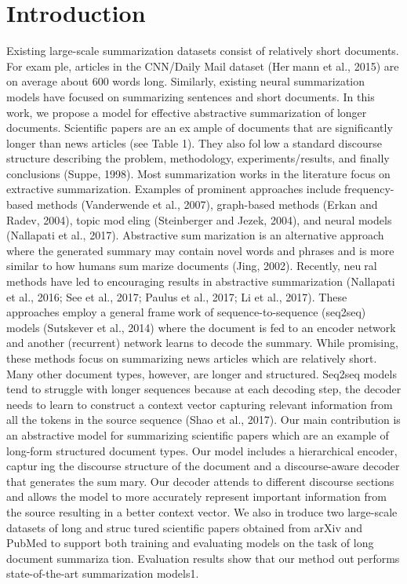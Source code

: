 \documentclass[aps,floatfix,prd,showpacs,twocolumn]{revtex4}
\begin{document}
\section{Introduction}
Existing large-scale summarization datasets
consist of relatively short documents. For example, articles in the CNN/Daily Mail dataset (Hermann et al., 2015) are on average about 600 words
long. Similarly, existing neural summarization
models have focused on summarizing sentences
and short documents. In this work, we propose a
model for effective abstractive summarization of
longer documents. Scientific papers are an example of documents that are significantly longer
than news articles (see Table 1). They also follow a standard discourse structure describing the
problem, methodology, experiments/results, and
finally conclusions (Suppe, 1998).
Most summarization works in the literature
focus on extractive summarization. Examples
of prominent approaches include frequency-based
methods (Vanderwende et al., 2007), graph-based
methods (Erkan and Radev, 2004), topic modeling (Steinberger and Jezek, 2004), and neural
models (Nallapati et al., 2017). Abstractive summarization is an alternative approach where the
generated summary may contain novel words and
phrases and is more similar to how humans summarize documents (Jing, 2002). Recently, neural methods have led to encouraging results in
abstractive summarization (Nallapati et al., 2016;
See et al., 2017; Paulus et al., 2017; Li et al.,
2017). These approaches employ a general framework of sequence-to-sequence (seq2seq) models
(Sutskever et al., 2014) where the document is
fed to an encoder network and another (recurrent)
network learns to decode the summary. While
promising, these methods focus on summarizing
news articles which are relatively short. Many
other document types, however, are longer and
structured. Seq2seq models tend to struggle with
longer sequences because at each decoding step,
the decoder needs to learn to construct a context
vector capturing relevant information from all the
tokens in the source sequence (Shao et al., 2017).
Our main contribution is an abstractive model
for summarizing scientific papers which are an
example of long-form structured document types.
Our model includes a hierarchical encoder, capturing the discourse structure of the document and a
discourse-aware decoder that generates the summary. Our decoder attends to different discourse
sections and allows the model to more accurately
represent important information from the source
resulting in a better context vector. We also introduce two large-scale datasets of long and structured scientific papers obtained from arXiv and
PubMed to support both training and evaluating
models on the task of long document summarization. Evaluation results show that our method outperforms state-of-the-art summarization models1.
\end{document}
